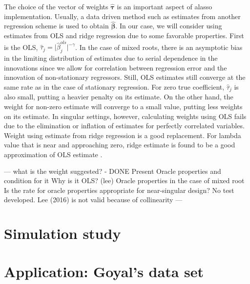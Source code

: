 \documentclass[12pt,a4paper]{article}
\begin{document}
The choice of the vector of weights $ \hat{\bm{\tau}} $ is an important aspect of alasso implementation. Usually, a data driven method such as estimates from another regression scheme is used to obtain $ \hat{\bm{\beta}}$. In our case, we will consider using estimates from OLS and ridge regression due to some favorable properties. First is the OLS, $ \hat{\tau}_j = \vert\hat{\beta}_j^{ols}\vert^{-\gamma} $. In the case of mixed roots, there is an asymptotic bias in the limiting distribution of estimates due to serial dependence in the innovations since we allow for correlation between regression error and the innovation of non-stationary regressors. Still, OLS estimates still converge at the same rate as in the case of stationary regression. For zero true coefficient, $ \hat{\tau}_j $ is also small, putting a heavier penalty on its estimate. On the other hand, the weight for non-zero estimate will converge to a small value, putting less weights on its estimate. In singular settings, however, calculating weights using OLS fails due to the elimination or inflation of estimates for perfectly correlated variables. Weight using estimate from ridge regression is a good replacement. For lambda value that is near and approaching zero, ridge estimate is found to be a good approximation of OLS estimate \citep{knight2000asymptotics}. 



--- what is the weight suggested? - DONE 
Present Oracle properties and condition for it
Why is it OLS? (lee) 
Oracle properties in the case of mixed root
Is the rate for oracle properties appropriate for near-singular design?
No test developed. Lee (2016) is not valid because of collinearity ---




\section{Simulation study}

\section{Application: Goyal's data set}



\end{document}
